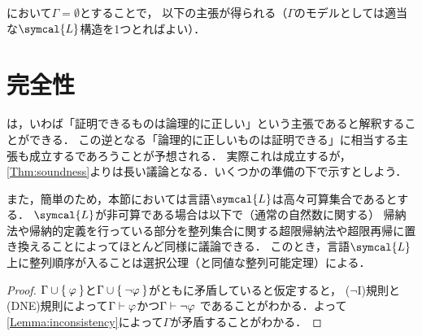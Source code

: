 において\(\Gamma = \emptyset\)とすることで，
以下の主張が得られる（\(\Gamma\)のモデルとしては適当な\(\symcal{L}\)構造を1つとればよい）．


\section{完全性} \label{sec:completeness}

は，いわば「証明できるものは論理的に正しい」という主張であると解釈することができる．
この逆となる「論理的に正しいものは証明できる」に相当する主張も成立するであろうことが予想される．
実際これは成立するが，\cref{Thm:soundness}よりは長い議論となる．いくつかの準備の下で示すとしよう．

また，簡単のため，本節においては言語\(\symcal{L}\)は高々可算集合であるとする．
\(\symcal{L}\)が非可算である場合は以下で（通常の自然数に関する）
帰納法や帰納的定義を行っている部分を整列集合に関する超限帰納法や超限再帰に置き換えることによってほとんど同様に議論できる．
このとき，言語\(\symcal{L}\)上に整列順序が入ることは選択公理（と同値な整列可能定理）による．


\begin{proof}
	\(\Gamma \cup \Set{\varphi}\)と\(\Gamma \cup \Set{\lnot \varphi}\)がともに矛盾していると仮定すると，
	(\(\lnot\)I)規則と(DNE)規則によって\(\Gamma \vdash \varphi\)かつ\(\Gamma \vdash \lnot \varphi\)
	であることがわかる．よって\cref{Lemma:inconsistency}によって\(\Gamma\)が矛盾することがわかる．
\end{proof}



